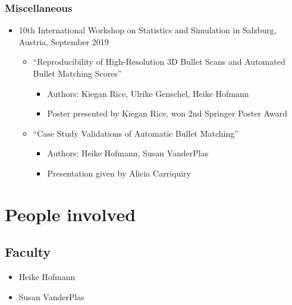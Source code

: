 \documentclass[]{book}
\providecommand{\tightlist}{%
  \setlength{\itemsep}{0pt}\setlength{\parskip}{0pt}}
\begin{document}
\hypertarget{miscellaneous}{%
\subsubsection{Miscellaneous}\label{miscellaneous}}

\begin{itemize}
\item
  10th International Workshop on Statistics and Simulation in Salzburg, Austria, September 2019

  \begin{itemize}
  \tightlist
  \item
    ``Reproducibility of High-Resolution 3D Bullet Scans and Automated Bullet Matching Scores''

    \begin{itemize}
    \tightlist
    \item
      Authors: Kiegan Rice, Ulrike Genschel, Heike Hofmann
    \item
      Poster presented by Kiegan Rice, won 2nd Springer Poster Award\\
    \end{itemize}
  \item
    ``Case Study Validations of Automatic Bullet Matching''

    \begin{itemize}
    \tightlist
    \item
      Authors: Heike Hofmann, Susan VanderPlas
    \item
      Presentation given by Alicia Carriquiry
    \end{itemize}
  \end{itemize}
\end{itemize}

\hypertarget{people-involved}{%
\section{People involved}\label{people-involved}}

\hypertarget{faculty}{%
\subsection{Faculty}\label{faculty}}

\begin{itemize}
\tightlist
\item
  Heike Hofmann
\item
  Susan VanderPlas
\end{itemize}
\end{document}
